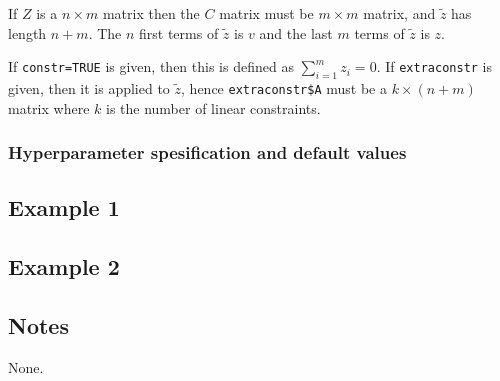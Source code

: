 \documentclass[a4paper,11pt]{article}
\begin{document}
If $Z$ is a $n\times m$ matrix then the $C$ matrix must be $m\times m$
matrix, and $\widetilde z$ has length $n+m$. The $n$ first terms of
$\widetilde z$ is $v$ and the last $m$ terms of $\widetilde z$ is $z$.

If \texttt{constr=TRUE} is given, then this is defined as
$\sum_{i=1}^{m}z_{i} = 0$. If \texttt{extraconstr} is given, then it
is applied to $\widetilde z$, hence \texttt{extraconstr\$A} must be a
$k\times (n+m)$ matrix where $k$ is the number of linear constraints.

\subsubsection*{Hyperparameter spesification and default values}



\subsection*{Example 1}

{\small}

\subsection*{Example 2}

{\small}

\subsection*{Notes}

None.
\end{document}
